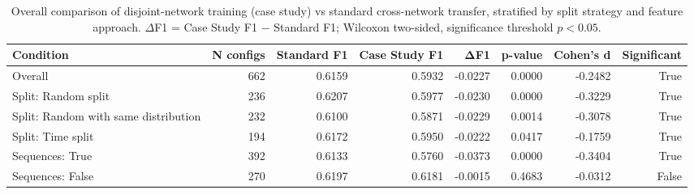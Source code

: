 \begin{table}
\caption{Overall comparison of disjoint-network training (case study) vs standard cross-network transfer, stratified by split strategy and feature approach. $\Delta$F1 = Case Study F1 $-$ Standard F1; Wilcoxon two-sided, significance threshold $p<0.05$.}
\label{tab:q6_overall}
\begin{tabular}{lrrrrrrr}
\toprule
Condition & N configs & Standard F1 & Case Study F1 & ΔF1 & p-value & Cohen's d & Significant \\
\midrule
Overall & 662 & 0.6159 & 0.5932 & -0.0227 & 0.0000 & -0.2482 & True \\
Split: Random split & 236 & 0.6207 & 0.5977 & -0.0230 & 0.0000 & -0.3229 & True \\
Split: Random with same distribution & 232 & 0.6100 & 0.5871 & -0.0229 & 0.0014 & -0.3078 & True \\
Split: Time split & 194 & 0.6172 & 0.5950 & -0.0222 & 0.0417 & -0.1759 & True \\
Sequences: True & 392 & 0.6133 & 0.5760 & -0.0373 & 0.0000 & -0.3404 & True \\
Sequences: False & 270 & 0.6197 & 0.6181 & -0.0015 & 0.4683 & -0.0312 & False \\
\bottomrule
\end{tabular}
\end{table}
